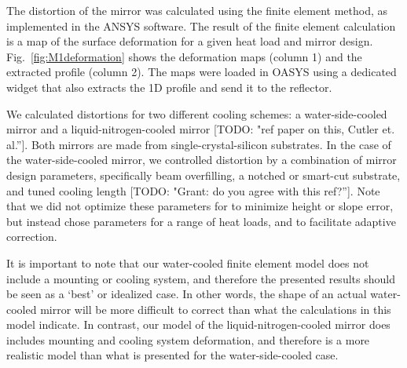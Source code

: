 \documentclass[preprint]{iucr}              %
\newcommand{\todo}[1]{{\color{red}[TODO: "#1'']}}
\begin{document}
The distortion of the mirror was calculated using the finite element method, as implemented in the ANSYS software. The result of the finite element calculation is a map of the surface deformation for a given heat load and mirror design. Fig.~\ref{fig:M1deformation} shows the deformation maps (column 1) and the extracted profile (column 2). The maps were loaded in OASYS using a dedicated widget that also extracts the 1D profile and send it to the reflector.

We calculated distortions for two different cooling schemes: a water-side-cooled mirror and a liquid-nitrogen-cooled mirror \todo{ref paper on this, Cutler et. al.}. Both mirrors are made from single-crystal-silicon substrates. In the case of the water-side-cooled mirror, we controlled distortion by a combination of mirror design parameters, specifically beam overfilling, a notched or smart-cut substrate, and tuned cooling length \cite{Zhang} \todo{Grant: do you agree with this ref?}.  Note that we did not optimize these parameters for to minimize height or slope error, but instead chose parameters for a range of heat loads, and to facilitate adaptive correction.

It is important to note that our water-cooled finite element model does not include a mounting or cooling system, and therefore the presented results should be seen as a `best' or idealized case.  In other words, the shape of an actual water-cooled mirror will be more difficult to correct than what the calculations in this model indicate. In contrast, our model of the liquid-nitrogen-cooled mirror does includes mounting and cooling system deformation, and therefore is a more realistic model than what is presented for the water-side-cooled case.
\end{document}
